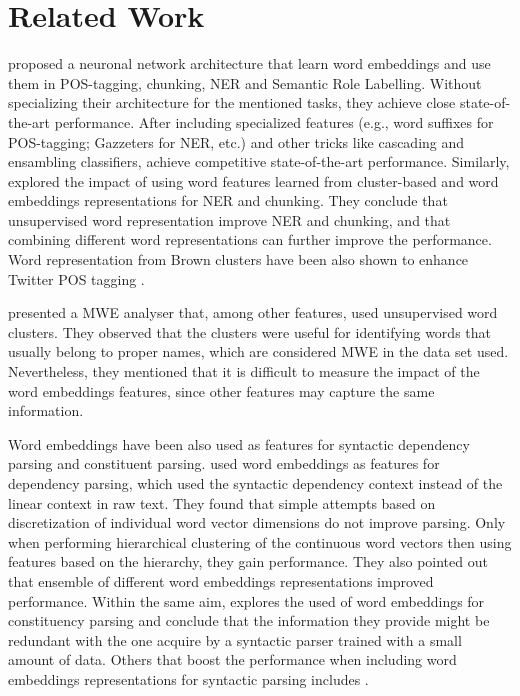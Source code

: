 \section{Related Work}

 proposed a neuronal network architecture
that learn word embeddings and use them in POS-tagging, chunking, NER and Semantic Role Labelling. 
Without specializing their architecture for the mentioned tasks, they achieve close state-of-the-art performance. After including specialized features (e.g., word suffixes for POS-tagging;  Gazzeters for NER, etc.) and other tricks like cascading and ensambling classifiers, achieve competitive state-of-the-art performance.
Similarly,  explored the impact of using word
features learned from cluster-based and word embeddings representations
for NER and chunking. 
They conclude that unsupervised word representation improve NER and chunking, and that combining different word representations can further improve the performance.
Word representation from Brown clusters have been also shown to enhance
Twitter POS tagging . 

 presented a MWE analyser that, among other features, used unsupervised word clusters. 
They observed that the clusters were useful for identifying words that usually belong to proper names, which are considered MWE in the data set used. Nevertheless, they mentioned that it is difficult to measure the impact of the word embeddings features, since other features may capture the same information. 

Word embeddings have been also used as features for syntactic dependency parsing and constituent parsing. 
 used word embeddings as features for dependency parsing, which used the syntactic dependency context instead of the linear context in raw text. They found that simple attempts based on discretization of individual word vector dimensions do not improve parsing. Only when performing hierarchical clustering of the continuous word vectors then using features based on the hierarchy, they gain performance. They also pointed out that ensemble of different word embeddings representations improved performance.
Within the same aim,  explores the used of word embeddings for constituency parsing and conclude that the
information they provide might be redundant with the one acquire by a syntactic parser trained with a small amount of data. Others that boost the performance when including word embeddings representations for syntactic parsing includes \cite{Koo:2008,Koo:2010,Haffari:2011,Tratz:2011}.


